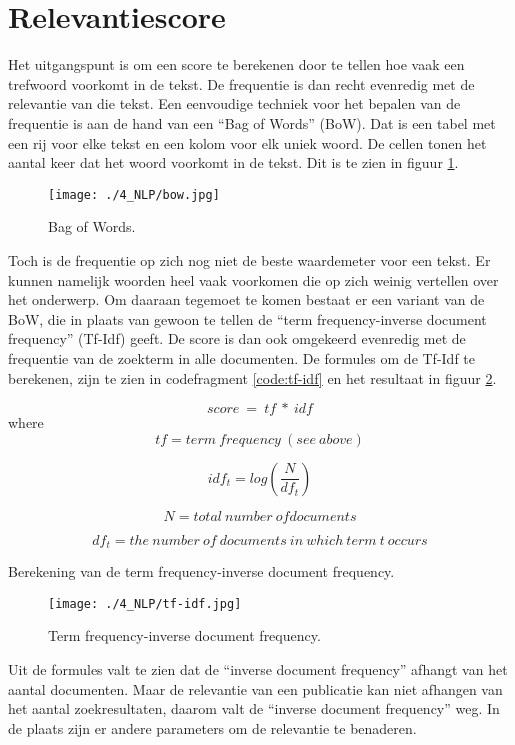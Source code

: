 \section{Relevantiescore}
Het uitgangspunt is om een score te berekenen door te tellen hoe vaak een trefwoord voorkomt in de tekst. De frequentie is dan recht evenredig met de relevantie van die tekst. Een eenvoudige techniek voor het bepalen van de frequentie is aan de hand van een ``Bag of Words'' (BoW). Dat is een tabel met een rij voor elke tekst en een kolom voor elk uniek woord. De cellen tonen het aantal keer dat het woord voorkomt in de tekst.  Dit is te zien in figuur \ref{fig:bow}.
\begin{figure}[h!]
    \centering
    \texttt{[image: ./4\_NLP/bow.jpg]}
    \caption[Bag of Words.]{\label{fig:bow}Bag of Words.}
\end{figure}
Toch is de frequentie op zich nog niet de beste waardemeter voor een tekst. Er kunnen namelijk woorden heel vaak voorkomen die op zich weinig vertellen over het onderwerp. Om daaraan tegemoet te komen bestaat er een variant van de BoW, die in plaats van gewoon te tellen de ``term frequency-inverse document frequency'' (Tf-Idf) geeft. De score is dan ook omgekeerd evenredig met de frequentie van de zoekterm in alle documenten. De formules om de Tf-Idf te berekenen, zijn te zien in codefragment \ref{code:tf-idf} en het resultaat in figuur \ref{fig:tf-idf}.
\begin{listing}[h!]
    \[
        score\ =\ tf\ \ast\ idf
    \]  
    where
    \[
        tf=term\ frequency\ \left(see\ above\right)
    \] 
    
    \[
        idf_t=log\left(\frac{N}{df_t}\right)
    \]  
    
    \[ 
        N=total\ number\ ofdocuments
    \]  
    
    \[ 
        df_t=the\ number\ of\ documents\ in\ which\ term\ t\ occurs
    \] 
     
    \caption[term frequency-inverse document frequency]{Berekening van de term frequency-inverse document frequency.}
    \label{code:tf-idf}
\end{listing}
\begin{figure}[h!]
    \centering
    \texttt{[image: ./4\_NLP/tf-idf.jpg]}
    \caption[term frequency-inverse document frequency.]{\label{fig:tf-idf}Term frequency-inverse document frequency.}
\end{figure}
Uit de formules valt te zien dat de ``inverse document frequency'' afhangt van het aantal documenten. Maar de relevantie van een publicatie kan niet afhangen van het aantal zoekresultaten, daarom valt de ``inverse document frequency'' weg. In de plaats zijn er andere parameters om de relevantie te benaderen.
